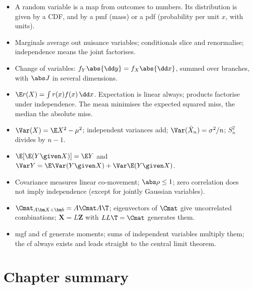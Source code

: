 \begin{recap}
\begin{itemize}[leftmargin=1.2em,itemsep=1pt]
  \item A random variable is a map from outcomes to numbers. Its distribution
        is given by a CDF, and by a pmf (mass) or a pdf (probability per unit
        $x$, with units).
  \item Marginals average out nuisance variables; conditionals slice and
        renormalise; independence means the joint factorises.
  \item Change of variables: $f_Y\abs{\dd y}=f_X\abs{\dd x}$, summed over
        branches, with $\abs J$ in several dimensions.
  \item $\E r(X)=\int r(x)f(x)\,\dd x$. Expectation is linear always;
        products factorise under independence. The mean minimises the expected
        squared miss, the median the absolute miss.
  \item $\Var(X)=\E X^2-\mu^2$; independent variances add;
        $\Var(\bar X_n)=\sigma^2/n$; $S_n^2$ divides by $n-1$.
  \item $\E[\E(Y\given X)]=\E Y$ and $\Var Y=\E\Var(Y\given X)+\Var\E(Y\given X)$.
  \item Covariance measures linear co-movement; $\abs\rho\le1$; zero
        correlation does not imply independence (except for jointly Gaussian
        variables).
  \item $\Cmat_{A\bm X+\bm b}=A\Cmat A\T$; eigenvectors of $\Cmat$ give
        uncorrelated combinations; $\bm X=L\bm Z$ with $LL\T=\Cmat$ generates them.
  \item mgf and cf generate moments; sums of independent variables multiply
        them; the cf always exists and leads straight to the central limit
        theorem.
\end{itemize}
\end{recap}
\clearpage
\section*{Chapter summary}
\label{1b:sec:summary}

